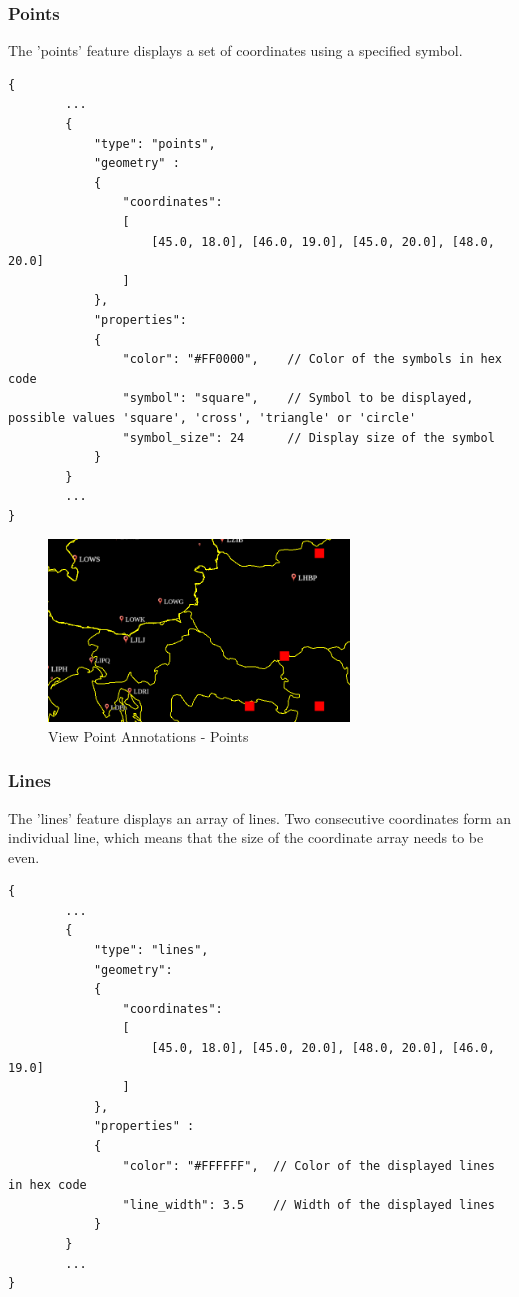 
\subsubsection{Points} The 'points' feature displays a set of coordinates using a specified symbol.

\begin{lstlisting}[basicstyle=\small\ttfamily]
{
        ...
        {
            "type": "points",
            "geometry" :
            {
                "coordinates": 
                [
                    [45.0, 18.0], [46.0, 19.0], [45.0, 20.0], [48.0, 20.0]
                ]
            },
            "properties":
            {
                "color": "#FF0000",    // Color of the symbols in hex code
                "symbol": "square",    // Symbol to be displayed, possible values 'square', 'cross', 'triangle' or 'circle'   
                "symbol_size": 24      // Display size of the symbol
            }
        }
        ...
}
\end{lstlisting}

\begin{figure}[H]
    \center
      \includegraphics[width=8cm]{figures/viewpoints_anno_example_points.png}
    \caption{View Point Annotations - Points} 
\end{figure}

\subsubsection{Lines} The 'lines' feature displays an array of lines. 
Two consecutive coordinates form an individual line, which means that the size of the coordinate array needs to be even.

\begin{lstlisting}[basicstyle=\small\ttfamily]
{
        ...
        {
            "type": "lines",
            "geometry":
            {
                "coordinates": 
                [
                    [45.0, 18.0], [45.0, 20.0], [48.0, 20.0], [46.0, 19.0]
                ]
            },
            "properties" :
            {
                "color": "#FFFFFF",  // Color of the displayed lines in hex code
                "line_width": 3.5    // Width of the displayed lines
            }
        }
        ...
}
\end{lstlisting}

